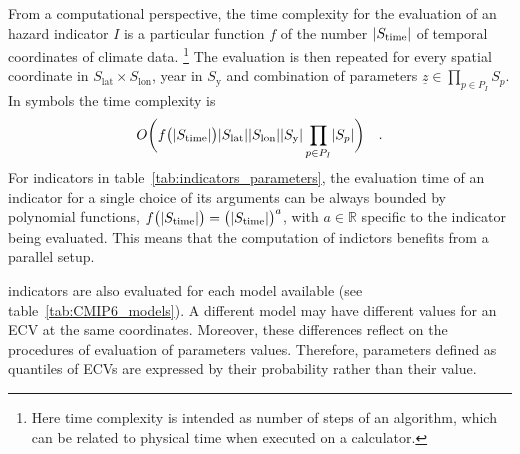 From a computational perspective, the time complexity for the evaluation of an \gls{hazard} \gls{indicator} $I$ is a particular function $f$ of the number $\lvert S_\text{time}\rvert$ of temporal coordinates of climate data.%
\footnote{Here time complexity is intended as number of steps of an algorithm, which can be related to physical time when executed on a calculator.}
The evaluation is then repeated for every spatial coordinate in $S_\text{lat} \times S_\text{lon}$, year in $S_\text{y}$ and combination of parameters $\underline{z} \in \prod_{p \in P_I} S_p$. In symbols the time complexity is
\begin{equation}
  \label{eq:complexity_parameters}
  O \bigg( f \big( \lvert S_\text{time}\rvert \big) \lvert S_\text{lat}\rvert \lvert S_\text{lon}\rvert \lvert S_\text{y}\rvert \prod_{p \in P_I} \lvert S_p\rvert \bigg)
  \quad .
\end{equation}
For indicators in table~\ref{tab:indicators_parameters}, the evaluation time of an indicator for a single choice of its arguments can be always bounded by polynomial functions, $f \big( \lvert S_\text{time}\rvert \big) = \big( \lvert S_\text{time}\rvert \big)^a $, with $a \in \mathbb{R}$ specific to the indicator being evaluated. This means that the computation of indictors benefits from a parallel setup.

\Glspl{indicator} are also evaluated for each model available (see table~\ref{tab:CMIP6_models}). A different model may have different values for an \gls{ECV} at the same coordinates. Moreover, these differences reflect on the procedures of evaluation of parameters values. Therefore, parameters defined as quantiles of \glspl{ECV} are expressed by their probability rather than their value.

